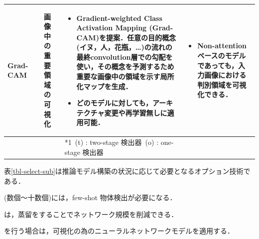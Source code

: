 \documentclass[twocolumn]{jsarticle} %
\begin{document}
\begin{table}
\begin{center}
\begin{tabularx}{\linewidth}{Xp{1.5cm}Xp{7cm}X}
            Grad-CAM & \cite{SCDVPB17,SCDVPB20} & 画像中の重要領域の可視化 & 
            \begin{itemize}
                \vspace{-0.7\baselineskip}
                \setlength{\leftskip}{-3mm}
                \item Gradient-weighted Class Activation Mapping (Grad-CAM)を提案．任意の目的概念(イヌ，人，花瓶，…)の流れの最終convolution層での勾配を使い，その概念を予測するため重要な画像中の領域を示す局所化マップを生成．
                \item どのモデルに対しても，アーキテクチャ変更や再学習無しに適用可能．
            \end{itemize}
            &
            \begin{itemize}
                \vspace{-0.7\baselineskip}
                \setlength{\leftskip}{-3mm}
                \item Non-attention ベースのモデルであっても，入力画像における判別領域を可視化できる．
            \end{itemize}
            \\
            \bottomrule
            &  &  & *1\ (t) : two-stage 検出器\quad *2\ (o) : one-stage 検出器 &  \\
        \end{tabularx}
    \end{center}
\end{table}%
表\ref{tbl-select-sub}は推論モデル構築の状況に応じて必要となるオプション技術である．

(数個〜十数個)には，few-shot 物体検出が必要になる\cite{KLWYFD19,FZTT20,WHGDY20}．

は，蒸留をすることでネットワーク規模を削減できる\cite{LJY17}．

を行う場合は，可視化の為のニューラルネットワークモデル\cite{SCDVPB17,SCDVPB20}を適用する．
\end{document}
